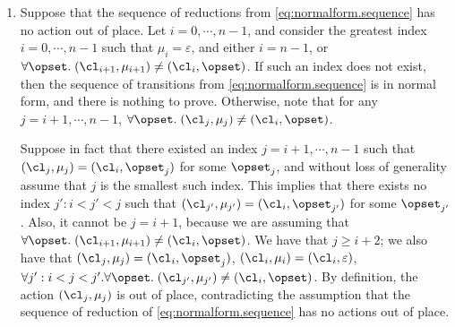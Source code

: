 \begin{enumerate}
\item Suppose that the sequence of reductions from \cref{eq:normalform.sequence} has no action out of place. 
Let $i=0,\cdots, n-1$, and consider the greatest index $i=0,\cdots, n-1$ such that  
$\mu_{i} = \varepsilon$, and either $i = n-1$, or 
$\forall \opset.\; (\cl_{i+1}, \mu_{i+1}) \neq (\cl_{i}, \opset)$. 
If such an index does not exist, then the sequence of transitions from \cref{eq:normalform.sequence} is in 
normal form, and there is nothing to prove. Otherwise, note that for any $j = i+1,\cdots, n-1$, 
$\forall \opset.\;(\cl_{j}, \mu_{j}) \neq (\cl_{i}, \opset)$. 

Suppose in fact that there existed 
an index $j = i+1,\cdots, n-1$ such that $(\cl_{j}, \mu_{j}) = (\cl_{i}, \opset_{j})$ for some 
$\opset_{j}$, and without loss of generality assume that $j$ is the smallest such index. This implies that 
there exists no index $j': i < j' < j$ such that $(\cl_{j'}, \mu_{j'}) = (\cl_{i}, \opset_{j'})$ for some 
$\opset_{j'}$. Also, it cannot be $j = i+1$, because we are assuming that $\forall \opset.\;(\cl_{i+1}, \mu_{i+1}) \neq 
(\cl_{i}, \opset)$.  We have that $j \geq i+2$; we also have that  $(\cl_{j}, \mu_{j}) = (\cl_{i}, \opset_{j})$, 
$(\cl_{i}, \mu_{i}) = (\cl_{i}, \varepsilon)$, $\forall j': i < j < j'.\forall \opset.\; (\cl_{j'}, \mu_{j'}) \neq (\cl_{i}, \opset)$. 
By definition, the action $(\cl_{j}, \mu_{j})$ is out of place, contradicting the assumption that the sequence of 
reduction of \cref{eq:normalform.sequence} has no actions out of place.


\end{enumerate}
